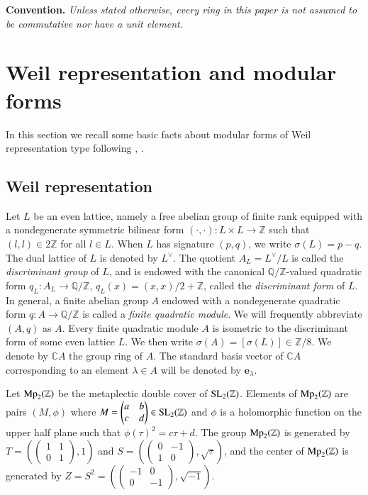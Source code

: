 \documentclass[12pt]{amsart}
\numberwithin{equation}{section}
\theoremstyle{definition}
\theoremstyle{remark}
\newcommand{\Z}{\mathbb{Z}}
\newcommand{\C}{\mathbb{C}}
\newcommand{\QZ}{\mathbb{Q}/\mathbb{Z}}
\newcommand{\elambda}{{\mathbf e}_{\lambda}}
\newcommand{\SL}{{\rm SL}_2(\mathbb{Z})}
\newcommand{\Mp}{{\rm Mp}_2(\mathbb{Z})}
\begin{document}
\vspace{0.2cm}

\textbf{Convention.} 
\textit{Unless stated otherwise, every ring in this paper is not assumed to be commutative nor have a unit element.} 



\section{Weil representation and modular forms}\label{sec: preliminary}

In this section we recall some basic facts about 
modular forms of Weil representation type 
following \cite{Bo98}, \cite{Br}. 
 

\subsection{Weil representation}\label{ssec: Weil representation} 

Let $L$ be an even lattice, namely 
a free abelian group of finite rank equipped with a nondegenerate symmetric bilinear form 
$(\cdot , \cdot) \colon L\times L \to {\Z}$ such that 
$(l ,l)\in 2{\Z}$ for all $l\in L$. 
When $L$ has signature $(p, q)$, we write $\sigma(L)=p-q$. 
The dual lattice of $L$ is denoted by $L^{\vee}$. 
The quotient $A_L=L^{\vee}/L$ is called the \textit{discriminant group} of $L$, 
and is endowed with the canonical ${\QZ}$-valued quadratic form 
$q_L \colon A_L\to {\QZ}$, $q_L(x)=(x, x)/2+{\Z}$, 
called the \textit{discriminant form} of $L$. 
In general, a finite abelian group $A$ endowed with a nondegenerate quadratic form 
$q \colon A\to{\QZ}$ is called a \textit{finite quadratic module}. 
We will frequently abbreviate $(A, q)$ as $A$. 
Every finite quadratic module $A$ is isometric to the discriminant form of some even lattice $L$. 
We then write $\sigma(A)=[\sigma(L)]\in {\Z}/8$. 
We denote by ${\C}A$ the group ring of $A$. 
The standard basis vector of ${\C}A$ corresponding to an element $\lambda\in A$ 
will be denoted by ${\elambda}$. 

Let ${\Mp}$ be the metaplectic double cover of ${\SL}$.   
Elements of ${\Mp}$ are pairs $(M, \phi)$ where 
$M=\begin{pmatrix}a & b \\ c & d \end{pmatrix}\in {\SL}$ 
and $\phi$ is a holomorphic function on the upper half plane such that $\phi(\tau)^2=c\tau+d$. 
The group ${\Mp}$ is generated by 
$T = \left( \begin{pmatrix}1&1\\ 0&1\end{pmatrix}, 1 \right)$ and %
$S = \left( \begin{pmatrix}0&-1\\ 1&0\end{pmatrix}, \sqrt{\tau} \right)$,  
and the center of ${\Mp}$ is generated by 
$Z = S^{2} = \left( \begin{pmatrix}-1& 0\\ 0 & -1 \end{pmatrix}, \sqrt{-1} \right)$. 
\end{document}
